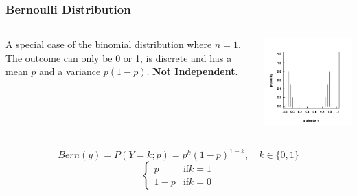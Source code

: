 \documentclass{beamer}
\begin{document}
\begin{frame}[fragile]
    \frametitle{Bernoulli Distribution}
    \large
    \begin{columns}
        \begin{column}{0.5\textwidth}
            A special case of the binomial distribution where $n = 1$. The outcome can only be 0 or 1, is discrete and has a mean $p$ and a variance $p(1-p)$. \textbf{Not Independent}.
        \end{column}
        \begin{column}{0.5\textwidth}
            \includegraphics[width=\textwidth]{lectures/day_9_refreshing_glm/figures/unnamed-chunk-7-1.png}
        \end{column}
    \end{columns}
    
    
    \[
    Bern(y) = P(Y = k; p) = p^k(1-p)^{1-k}, \quad k \in \{0,1\}
    \]
    \[
    \begin{cases}
        p & \text{if} k = 1\\
        1 - p & \text{if} k = 0
    \end{cases}
    \]
\end{frame}
\end{document}
